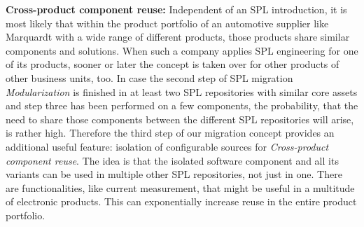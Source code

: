 \textbf{Cross-product component reuse:} Independent of an SPL introduction, it
is most likely that within the product portfolio of an automotive supplier like
Marquardt with a wide range of different products, those products share similar
components and solutions. When such a company applies SPL engineering for one of
its products, sooner or later the concept is taken over for other products of
other business units, too. In case the second step of SPL migration
\textit{Modularization} is finished in at least two SPL repositories with
similar core assets and step three has been performed on a few components, the
probability, that the need to share those components between the different SPL
repositories will arise, is rather high. Therefore the third step of our
migration concept provides an additional useful feature: isolation of
configurable sources for \textit{Cross-product component reuse}. The idea is
that the isolated software component and all its variants can be used in multiple
other SPL repositories, not just in one. There are functionalities, like current
measurement, that might be useful in a multitude of electronic products. This
can exponentially increase reuse in the entire product portfolio.
